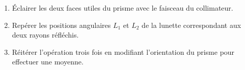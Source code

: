 \begin{enumerate}
    \item Éclairer les deux faces utiles du prisme avec le faisceau du collimateur.
    \item Repérer les positions angulaires $L_1$ et $L_2$ de la lunette correspondant aux deux rayons réfléchis.
    \item Réitérer l'opération trois fois en modifiant l'orientation du prisme pour effectuer une moyenne.
\end{enumerate}